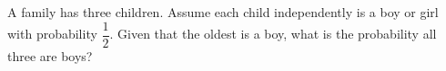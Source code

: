 A family has three children. Assume each child independently is a boy or girl with probability $\dfrac{1}{2}$. Given that the oldest is a boy, what is the probability all three are boys?
